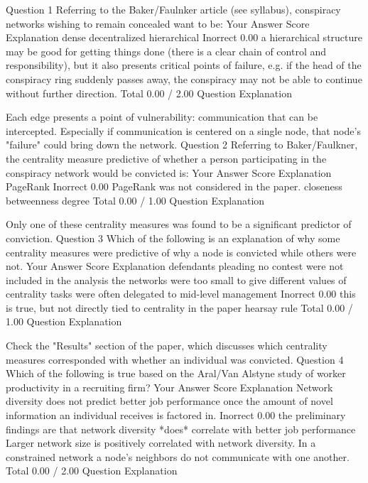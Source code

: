 Question 1
Referring to the Baker/Faulnker article (see syllabus), conspiracy networks wishing to remain concealed want to be:
Your Answer		Score	Explanation
dense			
decentralized			
hierarchical	Inorrect	0.00	a hierarchical structure may be good for getting things done (there is a clear chain of control and responsibility), but it also presents critical points of failure, e.g. if the head of the conspiracy ring suddenly passes away, the conspiracy may not be able to continue without further direction.
Total		0.00 / 2.00	
Question Explanation

Each edge presents a point of vulnerability: communication that can be intercepted. Especially if communication is centered on a single node, that node's "failure" could bring down the network.
Question 2
Referring to Baker/Faulkner, the centrality measure predictive of whether a person participating in the conspiracy network would be convicted is:
Your Answer		Score	Explanation
PageRank	Inorrect	0.00	PageRank was not considered in the paper.
closeness			
betweenness			
degree			
Total		0.00 / 1.00	
Question Explanation

Only one of these centrality measures was found to be a significant predictor of conviction.
Question 3
Which of the following is an explanation of why some centrality measures were predictive of why a node is convicted while others were not.
Your Answer		Score	Explanation
defendants pleading no contest were not included in the analysis			
the networks were too small to give different values of centrality			
tasks were often delegated to mid-level management	Inorrect	0.00	this is true, but not directly tied to centrality in the paper
hearsay rule			
Total		0.00 / 1.00	
Question Explanation

Check the "Results" section of the paper, which discusses which centrality measures corresponded with whether an individual was convicted.
Question 4
Which of the following is true based on the Aral/Van Alstyne study of worker productivity in a recruiting firm?
Your Answer		Score	Explanation
Network diversity does not predict better job performance once the amount of novel information an individual receives is factored in.	Inorrect	0.00	the preliminary findings are that network diversity *does* correlate with better job performance
Larger network size is positively correlated with network diversity.			
In a constrained network a node's neighbors do not communicate with one another.			
Total		0.00 / 2.00	
Question Explanation


